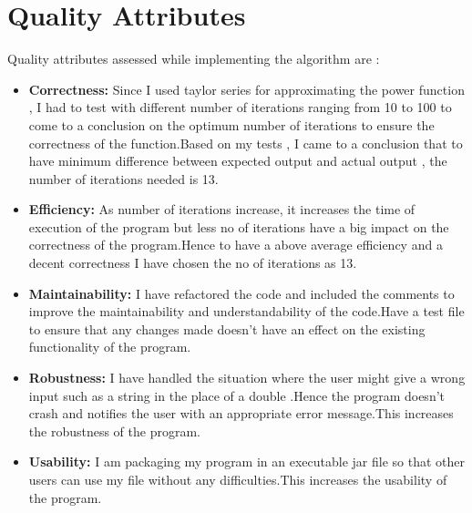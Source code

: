 \documentclass[a4paper, 11pt]{report}
\begin{document}
\section*{Quality Attributes}
Quality attributes assessed while implementing the algorithm  are :\\
\begin{itemize}
  \item \textbf{Correctness:} Since I used taylor series for approximating the power function , I had to test with different number of iterations ranging from 10 to 100 to come to a conclusion on the optimum number of iterations to ensure the correctness of the function.Based on my tests , I came to a conclusion that to have minimum difference between expected output and actual output , the number of iterations needed is 13.
  \item \textbf{Efficiency:} As number of iterations increase, it increases the time of execution of the program but less no of iterations have a big impact on the correctness of the program.Hence to have a above average efficiency and a decent correctness I have chosen the no of iterations as 13.
  \item \textbf{Maintainability:} I have refactored the code and included the comments to improve the maintainability and understandability of the code.Have a test file to ensure that any changes made doesn't have an effect on the existing functionality of the program.
  \item \textbf{Robustness:} I have handled the situation where the user might give a wrong input such as a string in the place of a double .Hence the program doesn't crash and notifies the user with an appropriate error message.This increases the robustness of the program.
  \item \textbf{Usability:} I am packaging my program in an executable jar file so that other users can use my file without any difficulties.This increases the usability of the program.
\end{itemize}

\newpage
\end{document}
